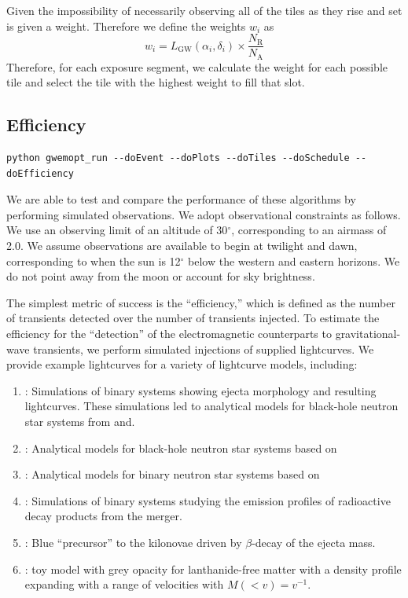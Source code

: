 \documentclass[twocolumn]{aastex62}
\begin{document}
Given the impossibility of necessarily observing all of the tiles as they rise and set 
is given a weight. 
Therefore we define the weights $w_i$ as
\begin{equation}
w_i = L_\textrm{GW}(\alpha_i,\delta_i) \times \frac{N_\textrm{R}}{N_\textrm{A}} 
\end{equation}
Therefore, for each exposure segment, we calculate the weight for each possible tile and select the tile with the highest weight to fill that slot.
\subsection{Efficiency}
\label{subsection:efficiency}
\begin{lstlisting}
python gwemopt_run --doEvent --doPlots --doTiles --doSchedule --doEfficiency
\end{lstlisting}
We are able to test and compare the performance of these algorithms by performing simulated observations. 
We adopt observational constraints as follows. 
We use an observing limit of an altitude of 30$^\circ$, corresponding to an airmass of 2.0. 
We assume observations are available to begin at twilight and dawn, corresponding to when the sun is 12$^\circ$ below the western and eastern horizons.
We do not point away from the moon or account for sky brightness.

The simplest metric of success is the ``efficiency,'' which is defined as the number of transients detected over the number of transients injected.
To estimate the efficiency for the ``detection'' of the electromagnetic counterparts to gravitational-wave transients, we perform simulated injections of supplied lightcurves. 
We provide example lightcurves for a variety of lightcurve models, including:

\begin{enumerate}
\item \cite{TaHo2014}: Simulations of binary systems showing ejecta morphology and resulting lightcurves. These simulations led to analytical models for black-hole neutron star systems from \cite{KaKy2016} and\cite{DiUj2017}.
\item \cite{KaKy2016}: Analytical models for black-hole neutron star systems based on \cite{TaHo2014}
\item \cite{DiUj2017}: Analytical models for binary neutron star systems based on \cite{TaHo2014}
\item \cite{BaKa2016}: Simulations of binary systems studying the emission profiles of radioactive decay products from the merger.
\item \cite{MeBa2015}: Blue ``precursor'' to the kilonovae driven by $\beta$-decay of the ejecta mass.
\item \cite{Me2017}: toy model with grey opacity for lanthanide-free matter with a density profile expanding with a range of velocities with $M(< v) = v^{-1}$.
\end{enumerate}
\end{document}
